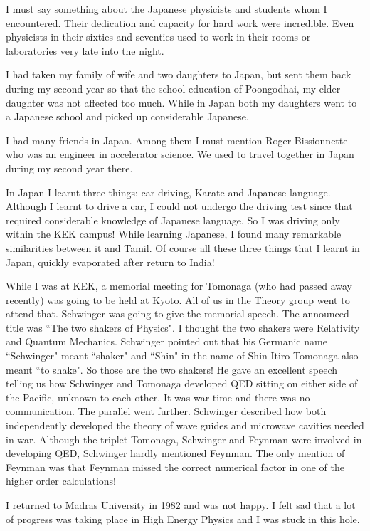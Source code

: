 I must say something about the Japanese physicists and students whom I 
encountered. Their dedication and capacity for hard work were 
incredible. Even physicists in their sixties and seventies used to work 
in their rooms or laboratories very late into the night.

I had taken my family of wife and two daughters to Japan, but sent them 
back during my second year so that the school education of Poongodhai, my 
elder daughter was not affected too much. While in Japan both my 
daughters went to a Japanese school and picked up considerable Japanese.

I had many friends in Japan. Among them I must mention Roger 
Bissionnette who was an engineer in accelerator science. We used to 
travel together in Japan during my second year there.

In Japan I learnt three things: car-driving, Karate and Japanese 
language. Although I learnt to drive a car, I could not undergo the 
driving test since that required considerable knowledge of Japanese 
language. So I was driving only within the KEK campus! While learning 
Japanese, I found many remarkable similarities between it and Tamil. Of 
course all these three things that I learnt in Japan, quickly evaporated 
after return to India!

While I was at KEK, a memorial meeting for Tomonaga (who had passed away 
recently) was going to be held at Kyoto. All of us in the Theory group 
went to attend that. Schwinger was going to give the memorial speech. 
The announced title was ``The two shakers of Physics". I thought the two 
shakers were Relativity and Quantum Mechanics. Schwinger pointed out 
that his Germanic name ``Schwinger" meant ``shaker" and ``Shin" in the name 
of Shin Itiro Tomonaga also meant ``to shake". So those are the two 
shakers! He gave an excellent speech telling us how Schwinger and 
Tomonaga developed QED sitting on either side of the Pacific, unknown to 
each other. It was war time and there was no communication. The parallel 
went further. Schwinger described how both independently developed the 
theory of wave guides and microwave cavities needed in war. Although the 
triplet Tomonaga, Schwinger and Feynman were involved in developing QED, 
Schwinger hardly mentioned Feynman. The only mention of Feynman was that 
Feynman missed the correct numerical factor in one of the higher order 
calculations!
 
I returned to Madras University in 1982 and was not happy. I felt sad 
that a lot of progress was taking place in High Energy Physics and I was 
stuck in this hole.

